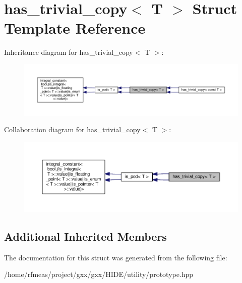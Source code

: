 \hypertarget{structhas__trivial__copy}{}\section{has\+\_\+trivial\+\_\+copy$<$ T $>$ Struct Template Reference}
\label{structhas__trivial__copy}


Inheritance diagram for has\+\_\+trivial\+\_\+copy$<$ T $>$\+:
\nopagebreak
\begin{figure}[H]
\begin{center}
\leavevmode
\includegraphics[width=350pt]{structhas__trivial__copy__inherit__graph}
\end{center}
\end{figure}


Collaboration diagram for has\+\_\+trivial\+\_\+copy$<$ T $>$\+:
\nopagebreak
\begin{figure}[H]
\begin{center}
\leavevmode
\includegraphics[width=350pt]{structhas__trivial__copy__coll__graph}
\end{center}
\end{figure}
\subsection*{Additional Inherited Members}


The documentation for this struct was generated from the following file\+:\begin{DoxyCompactItemize}
\item 
/home/rfmeas/project/gxx/gxx/\+H\+I\+D\+E/utility/prototype.\+hpp\end{DoxyCompactItemize}
